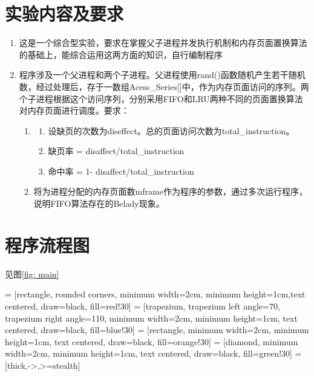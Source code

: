\documentclass[11pt]{article}
\begin{document}
\section{实验内容及要求}
\begin{enumerate}
  \item 这是一个综合型实验，要求在掌握父子进程并发执行机制和内存页面置换算法的基础上，能综合运用这两方面的知识，自行编制程序 
  \item 程序涉及一个父进程和两个子进程。父进程使用rand()函数随机产生若干随机数，经过处理后，存于一数组Acess\_Series[]中，作为内存页面访问的序列。两个子进程根据这个访问序列，分别采用FIFO和LRU两种不同的页面置换算法对内存页面进行调度。要求：
    \begin{enumerate}
      \item 
        \begin{enumerate}
          \item 设缺页的次数为diseffect。总的页面访问次数为total\_instruction。
          \item 缺页率 = disaffect/total\_instruction
          \item 命中率 = 1- disaffect/total\_instruction 
        \end{enumerate}
      \item 将为进程分配的内存页面数mframe作为程序的参数，通过多次运行程序，说明FIFO算法存在的Belady现象。
    \end{enumerate}
\end{enumerate}

\section{程序流程图}
见图\ref{fig: main}

 = [rectangle, rounded corners, minimum width=2cm, minimum height=1cm,text centered, draw=black, fill=red!30]
 = [trapezium, trapezium left angle=70, trapezium right angle=110, minimum width=2cm, minimum height=1cm, text centered, draw=black, fill=blue!30]
 = [rectangle, minimum width=2cm, minimum height=1cm, text centered, draw=black, fill=orange!30]
 = [diamond, minimum width=2cm, minimum height=1cm, text centered, draw=black, fill=green!30]
 = [thick,->,>=stealth]
\end{document}
